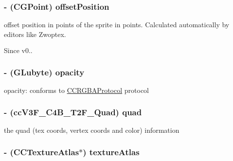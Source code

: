  \hypertarget{class_c_c_sprite_a78652c4a769da10893cb53fc4121c6cd}{
\subsubsection[{offset\-Position}]{\setlength{\rightskip}{0pt plus 5cm}-\/ (C\-G\-Point) {\bf offset\-Position}}}\label{class_c_c_sprite_a78652c4a769da10893cb53fc4121c6cd}
offset position in points of the sprite in points. Calculated automatically by editors like Zwoptex. \begin{DoxySince}{Since}
v0.. 
\end{DoxySince}
\hypertarget{class_c_c_sprite_a1fbf07d9d812aea2002d836c95b675cb}{
\subsubsection[{opacity}]{\setlength{\rightskip}{0pt plus 5cm}-\/ (G\-Lubyte) {\bf opacity}}}\label{class_c_c_sprite_a1fbf07d9d812aea2002d836c95b675cb}
opacity\-: conforms to \hyperlink{protocol_c_c_r_g_b_a_protocol-p}{C\-C\-R\-G\-B\-A\-Protocol} protocol \hypertarget{class_c_c_sprite_aa7320418535244fb729d1bbb7b692deb}{
\subsubsection[{quad}]{\setlength{\rightskip}{0pt plus 5cm}-\/ ({\bf cc\-V3\-F\-\_\-\-C4\-B\-\_\-\-T2\-F\-\_\-\-Quad}) {\bf quad}}}\label{class_c_c_sprite_aa7320418535244fb729d1bbb7b692deb}
the quad (tex coords, vertex coords and color) information \hypertarget{class_c_c_sprite_ad56b246727da63664eb32498d2fccb7f}{
\subsubsection[{texture\-Atlas}]{\setlength{\rightskip}{0pt plus 5cm}-\/ ({\bf C\-C\-Texture\-Atlas}$\ast$) {\bf texture\-Atlas}}}\label{class_c_c_sprite_ad56b246727da63664eb32498d2fccb7f}
